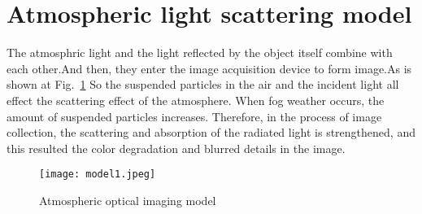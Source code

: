 \documentclass[10pt,twocolumn,letterpaper]{article}
\begin{document}
\section{Atmospheric light scattering model}
 \par The atmosphric light and the light reflected by the object itself combine with each other.And then, they enter the image acquisition device to form image.As is shown at Fig.~\ref{model1} So the suspended particles in the air and the incident light all effect the scattering effect of the atmosphere. When fog weather occurs, the amount of suspended particles increases. Therefore, in the process of image collection, the scattering and absorption of the radiated light is strengthened, and this resulted the color degradation and blurred details in the image.
\begin{figure}[htbp]
 \centering{}
\texttt{[image: model1.jpeg]}\\
 \caption{Atmospheric optical imaging model}
\label{model1}
\end{figure}
\end{document}
